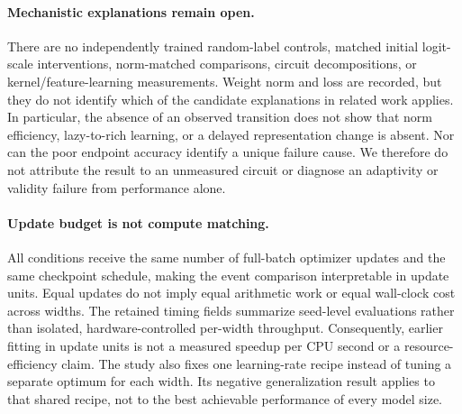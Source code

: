 \documentclass{article}
\begin{document}
\paragraph{Mechanistic explanations remain open.}
There are no independently trained random-label controls, matched initial logit-scale interventions, norm-matched comparisons, circuit decompositions, or kernel/feature-learning measurements. Weight norm and loss are recorded, but they do not identify which of the candidate explanations in related work applies. In particular, the absence of an observed transition does not show that norm efficiency, lazy-to-rich learning, or a delayed representation change is absent. Nor can the poor endpoint accuracy identify a unique failure cause. We therefore do not attribute the result to an unmeasured circuit or diagnose an adaptivity or validity failure from performance alone.

\paragraph{Update budget is not compute matching.}
All conditions receive the same number of full-batch optimizer updates and the same checkpoint schedule, making the event comparison interpretable in update units. Equal updates do not imply equal arithmetic work or equal wall-clock cost across widths. The retained timing fields summarize seed-level evaluations rather than isolated, hardware-controlled per-width throughput. Consequently, earlier fitting in update units is not a measured speedup per CPU second or a resource-efficiency claim. The study also fixes one learning-rate recipe instead of tuning a separate optimum for each width. Its negative generalization result applies to that shared recipe, not to the best achievable performance of every model size.
\end{document}
